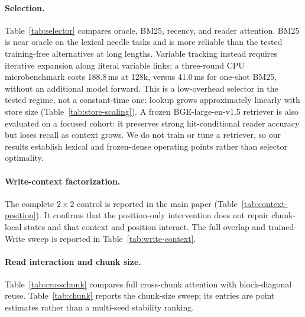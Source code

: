 



\paragraph{Selection.}
Table~\ref{tab:selector} compares oracle, BM25, recency, and reader attention.
BM25 is near oracle on the lexical needle tasks and is more reliable than the
tested training-free alternatives at long lengths. Variable tracking instead
requires iterative expansion along literal variable links; a three-round CPU
microbenchmark costs 188.8\,ms at 128k, versus 41.0\,ms for one-shot BM25, without
an additional model forward. This is a low-overhead selector in the tested
regime, not a constant-time one: lookup grows approximately linearly with store
size (Table~\ref{tab:store-scaling}). A frozen BGE-large-en-v1.5 retriever is
also evaluated on a focused cohort: it preserves strong hit-conditional reader
accuracy but loses recall as context grows. We do not train or tune a retriever,
so our results establish lexical and frozen-dense operating points rather than
selector optimality.



\paragraph{Write-context factorization.}
The complete $2{\times}2$ control is reported in the main paper
(Table~\ref{tab:context-position}). It confirms that the position-only
intervention does not repair chunk-local states and that context and position
interact. The full overlap and trained-Write sweep is reported in
Table~\ref{tab:write-context}.



\paragraph{Read interaction and chunk size.}
Table~\ref{tab:crosschunk} compares full cross-chunk attention with
block-diagonal reuse. Table~\ref{tab:chunk} reports the chunk-size sweep; its
entries are point estimates rather than a multi-seed stability ranking.



